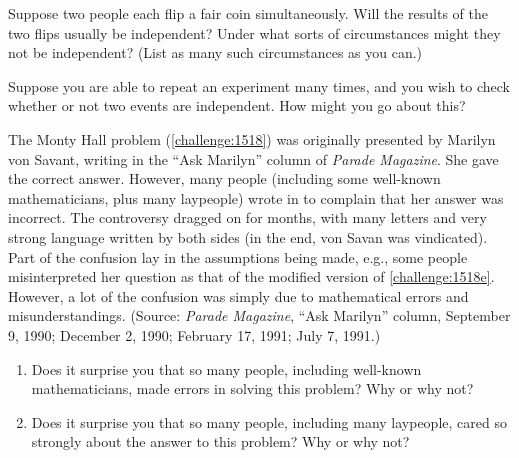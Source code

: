 \begin{discussion}
    \item Suppose two people each flip a fair coin simultaneously. Will the results of the two flips usually be independent? Under what sorts of circumstances might they not be independent? (List as many such circumstances as you can.)
    \item Suppose you are able to repeat an experiment many times, and you wish to check whether or not two events are independent. How might you go about this?
    \item The Monty Hall problem (\autoref{challenge:1518}) was originally presented by Marilyn von Savant, writing in the ``Ask Marilyn'' column of \emph{Parade Magazine}. She gave the correct answer. However, many people (including some well-known mathematicians, plus many laypeople) wrote in to complain that her answer was incorrect. The controversy dragged on for months, with many letters and very strong language written by both sides (in the end, von Savan was vindicated). Part of the confusion lay in the assumptions being made, e.g., some people misinterpreted her question as that of the modified version of \autoref{challenge:1518e}. However, a lot of the confusion was simply due to mathematical errors and misunderstandings. (Source: \emph{Parade Magazine}, ``Ask Marilyn'' column, September 9, 1990; December 2, 1990; February 17, 1991; July 7, 1991.)
    \begin{enumerate}
        \item Does it surprise you that so many people, including well-known mathematicians, made errors in  solving this problem? Why or why not?
        \item Does it surprise you that so many people, including many laypeople, cared so strongly about the answer to this problem? Why or why not?
    \end{enumerate}
\end{discussion}